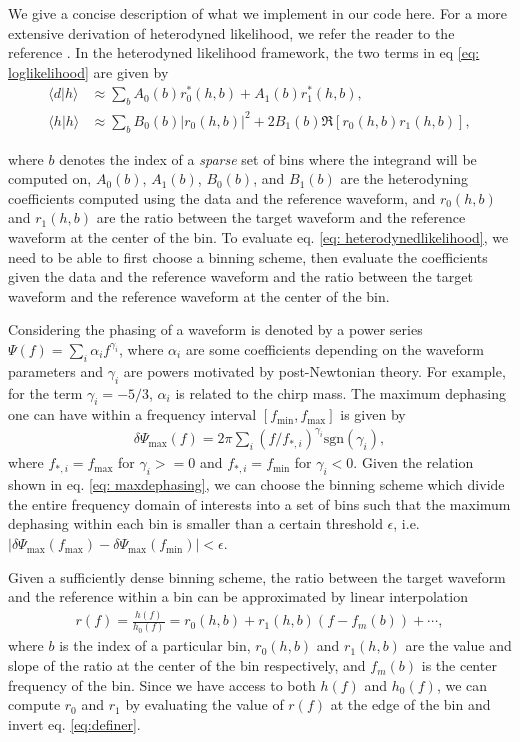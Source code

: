 \documentclass[twocolumn]{aastex631}
\begin{document}
We give a concise description of what we implement in our code here. For a more
extensive derivation of heterodyned likelihood, we refer the reader to the
reference \cite{Zackay:2018qdy}. In the heterodyned likelihood framework, the
two terms in eq \ref{eq: loglikelihood} are given by
\begin{align}
    \langle d|h \rangle &\approx \sum_b A_0(b) r^*_0(h,b) + A_1(b) r^*_1(h,b), \nonumber \\
    \langle h|h \rangle &\approx \sum_b B_0(b) |r_0(h,b)|^2 + 2 B_1(b) \Re[r_0(h,b)r_1(h,b)],
\label{eq: heterodynedlikelihood}
\end{align}

where $b$ denotes the index of a \textit{sparse} set of bins where the integrand
will be computed on, $A_0(b)$, $A_1(b)$, $B_0(b)$, and $B_1(b)$ are the
heterodyning coefficients computed using the data and the reference waveform,
and $r_0(h,b)$ and $r_1(h,b)$ are the ratio between the target waveform and the
reference waveform at the center of the bin. To evaluate eq. \ref{eq:
heterodynedlikelihood}, we need to be able to first choose a binning scheme,
then evaluate the coefficients given the data and the reference waveform and the
ratio between the target waveform and the reference waveform at the center of
the bin.

Considering the phasing of a waveform is denoted by a power series $\Psi(f) =
\sum_i \alpha_i f^{\gamma_i}$, where $\alpha_i$ are some coefficients depending
on the waveform parameters and $\gamma_i$ are powers motivated by post-Newtonian
theory. For example, for the term $\gamma_i = -5/3$, $\alpha_i$ is related to
the chirp mass. The maximum dephasing one can have within a frequency interval $[f_{\textrm{min}},f_{\textrm{max}}]$ is given by
\begin{align}
    \delta \Psi_{\textrm{max}}(f) = 2\pi \sum_{i} (f/f_{*,i})^{\gamma_i} \textrm{sgn}(\gamma_i),
\label{eq: maxdephasing}
\end{align}
where $f_{*,i} = f_{\textrm{max}}$ for $\gamma_i>=0$ and $f_{*,i} =
f_{\textrm{min}}$ for $\gamma_i<0$. Given the relation shown in eq. \ref{eq:
maxdephasing}, we can choose the binning scheme which divide the entire
frequency domain of interests into a set of bins such that the maximum dephasing
within each bin is smaller than a certain threshold $\epsilon$, i.e.
$|\delta\Psi_{\textrm{max}}(f_{\textrm{max}}) -
\delta\Psi_{\textrm{max}}(f_{\textrm{min}})| < \epsilon$. 

Given a sufficiently dense binning scheme, the ratio between the target waveform
and the reference within a bin can be approximated by linear interpolation
\begin{align}
r(f) = \frac{h(f)}{h_0(f)} = r_0(h,b) + r_1(h,b)(f- f_m(b)) + \cdots,
\label{eq:definer}
\end{align}
where $b$ is the index of a particular bin, $r_0(h,b)$ and $r_1(h,b)$ are the
value and slope of the ratio at the center of the bin respectively, and
$f_m(b)$ is the center frequency of the bin. Since we have access to both $h(f)$
and $h_0(f)$, we can compute $r_0$ and $r_1$ by evaluating the value of $r(f)$
at the edge of the bin and invert eq. \ref{eq:definer}.
\end{document}
